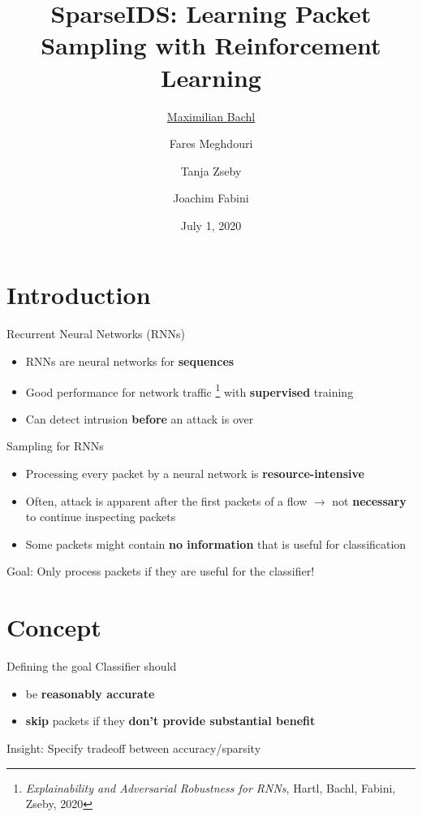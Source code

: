 \documentclass[xcolor={dvipsnames}]{beamer}
\title{SparseIDS: Learning Packet Sampling with Reinforcement Learning}
\author[M. Bachl et al.]{%
	\underline{Maximilian Bachl}\email{maximilian.bachl@tuwien.ac.at} \and Fares Meghdouri \and Tanja Zseby \and Joachim Fabini
}
\institute{%
	Technische Universität Wien, Vienna, Austria
}
\date[July 1, 2020]{July 1, 2020}
\begin{document}
\maketitle

\section{Introduction}

\begin{frame}{Recurrent Neural Networks (RNNs)}
\begin{itemize}
\item RNNs are neural networks for \textbf{sequences}
\item Good performance for network traffic \footnote{\textit{Explainability and Adversarial Robustness for RNNs}, Hartl, Bachl, Fabini, Zseby, 2020} with \textbf{supervised} training
\item Can detect intrusion \textbf{before} an attack is over
\end{itemize}
\end{frame}

\begin{frame}{Sampling for RNNs}
\begin{itemize}
\item Processing every packet by a neural network is \textbf{resource-intensive}
\item Often, attack is apparent after the first packets of a flow $\rightarrow$ not \textbf{necessary} to continue inspecting packets
\item Some packets might contain \textbf{no information} that is useful for classification
\end{itemize}
\pause
\begin{block}{Goal:}
Only process packets if they are useful for the classifier! 
\end{block}
\end{frame}

\section{Concept}

\begin{frame}{Defining the goal}
Classifier should
\begin{itemize}
\item be \textbf{reasonably accurate}
\item \textbf{skip} packets if they \textbf{don't provide substantial benefit}
\end{itemize}
\pause
\begin{block}{Insight:}
Specify tradeoff between accuracy/sparsity 
\end{block}
\end{frame}
\end{document}

